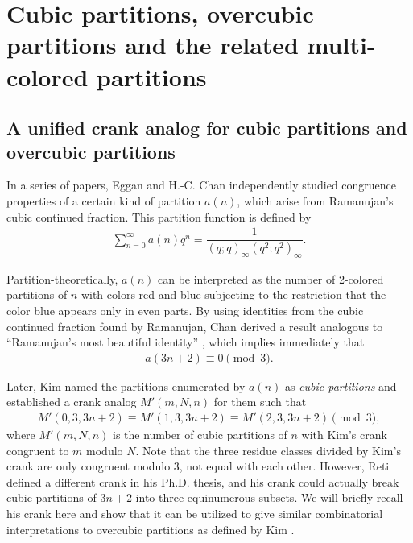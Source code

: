 \documentclass[12pt]{amsart}
\numberwithin{equation}{section}
\theoremstyle{plain}
\theoremstyle{definition}
\begin{document}
\section{Cubic partitions, overcubic partitions and the related multi-colored partitions}
\label{sec: cubic}

\subsection{A unified crank analog for cubic partitions and overcubic partitions}
In a series of papers, Eggan \cite{Egg} and H.-C. Chan \cite{Cha1,Cha2,Cha3} independently studied congruence properties of a certain kind of partition $a(n)$, which arise from Ramanujan's cubic continued fraction. This partition function is defined by
\begin{align*}
\sum_{n=0}^{\infty}a(n)q^{n}=\dfrac{1}{(q;q)_{\infty}(q^{2};q^{2})_{\infty}}.
\end{align*}

Partition-theoretically, $a(n)$ can be interpreted as the number of 2-colored partitions of $n$ with colors red and blue subjecting to the restriction that the color blue appears only in even parts. By using identities from the cubic continued fraction found by Ramanujan, Chan derived a result analogous to ``Ramanujan's most beautiful identity'' \cite{Ram}, which implies immediately that
\begin{align}\label{cubic-mod3}
a(3n+2)\equiv0\pmod{3}.
\end{align}

Later, Kim \cite{Kim2} named the partitions enumerated by $a(n)$ as \emph{cubic partitions} and established a crank analog $M'(m,N,n)$ for them such that
\begin{align*}
M'(0,3,3n+2)\equiv M'(1,3,3n+2)\equiv M'(2,3,3n+2)\pmod{3},
\end{align*}
where $M'(m,N,n)$ is the number of cubic partitions of $n$ with Kim's crank congruent to $m$ modulo $N$. Note that the three residue classes divided by Kim's crank are only congruent modulo $3$, not equal with each other. However, Reti \cite{Ret} defined a different crank in his Ph.D. thesis, and his crank could actually break cubic partitions of $3n+2$ into three equinumerous subsets. We will briefly recall his crank here and show that it can be utilized to give similar combinatorial interpretations to overcubic partitions as defined by Kim \cite{Kim4}.
\end{document}
